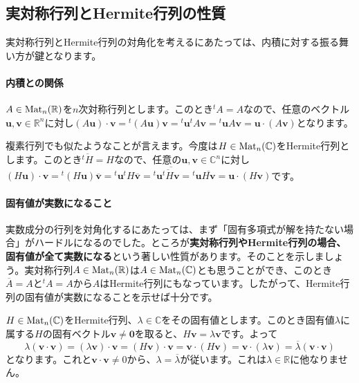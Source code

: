 \subsection{実対称行列とHermite行列の性質}

実対称行列とHermite行列の対角化を考えるにあたっては、内積に対する振る舞い方が鍵となります。

\paragraph{内積との関係}

$A \in \operatorname{Mat}_n(\mathbb{R})$を$n$次対称行列とします。このとき${}^t\!A = A$なので、任意のベクトル$\bm{u}, \bm{v} \in \mathbb{R}^n$に対し$(A\bm{u}) \cdot \bm{v} = {}^t(A\bm{u}) \bm{v} = {}^t\bm{u} {}^t\!A \bm{v} = {}^t\bm{u} A\bm{v} = \bm{u} \cdot (A\bm{v})$となります。

複素行列でも似たようなことが言えます。今度は$H \in \operatorname{Mat}_n(\mathbb{C})$をHermite行列とします。このとき$\overline{{}^tH} = H$なので、任意の$\bm{u}, \bm{v} \in \mathbb{C}^n$に対し$(H\bm{u})\cdot \bm{v} = {}^t(H\bm{u}) \overline{\bm{v}} = {}^t\bm{u} {}^t\!H\overline{\bm{v}} = {}^t\bm{u} \overline{\overline{{}^t\!H}\bm{v}} = {}^t\bm{u} \overline{H\bm{v}} = \bm{u} \cdot (H\bm{v})$です。

\paragraph{固有値が実数になること}

実数成分の行列を対角化するにあたっては、まず「固有多項式が解を持たない場合」がハードルになるのでした。ところが\textbf{実対称行列やHermite行列の場合、固有値が全て実数になる}という著しい性質があります。そのことを示しましょう。実対称行列$A \in \operatorname{Mat}_n(\mathbb{R})$は$A \in \operatorname{Mat}_n(\mathbb{C})$とも思うことができ、このとき$\overline{A} = A$と${}^t\!A = A$から$A$はHermite行列にもなっています。したがって、Hermite行列の固有値が実数になることを示せば十分です。

$H \in \operatorname{Mat}_n(\mathbb{C})$をHermite行列、$\lambda \in \mathbb{C}$をその固有値とします。このとき固有値$\lambda$に属する$H$の固有ベクトル$\bm{v} \neq \bm{0}$を取ると、$H\bm{v} = \lambda \bm{v}$です。よって
\[
\lambda(\bm{v} \cdot \bm{v}) = (\lambda\bm{v}) \cdot \bm{v} = (H\bm{v}) \cdot \bm{v} = \bm{v} \cdot (H\bm{v})
= \bm{v} \cdot (\lambda\bm{v}) = \overline{\lambda} (\bm{v} \cdot \bm{v})
\]
となります。これと$\bm{v} \cdot \bm{v} \neq 0$から、$\lambda = \overline{\lambda}$が従います。これは$\lambda \in \mathbb{R}$に他なりません。

